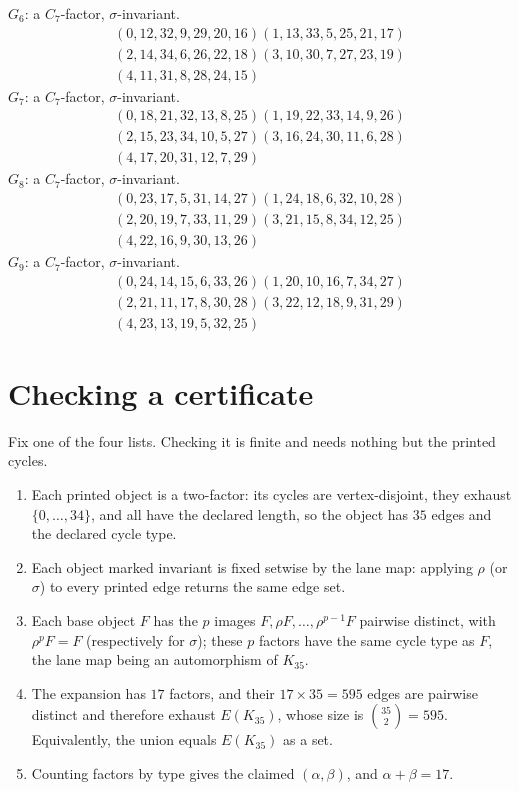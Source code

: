 \documentclass[11pt]{amsart}
\begin{document}
\smallskip\noindent $G_{6}$: a $C_7$-factor, $\sigma$-invariant.
\begin{gather*}
  (0,12,32,9,29,20,16)(1,13,33,5,25,21,17) \\
  (2,14,34,6,26,22,18)(3,10,30,7,27,23,19) \\
  (4,11,31,8,28,24,15)
\end{gather*}
\smallskip\noindent $G_{7}$: a $C_7$-factor, $\sigma$-invariant.
\begin{gather*}
  (0,18,21,32,13,8,25)(1,19,22,33,14,9,26) \\
  (2,15,23,34,10,5,27)(3,16,24,30,11,6,28) \\
  (4,17,20,31,12,7,29)
\end{gather*}
\smallskip\noindent $G_{8}$: a $C_7$-factor, $\sigma$-invariant.
\begin{gather*}
  (0,23,17,5,31,14,27)(1,24,18,6,32,10,28) \\
  (2,20,19,7,33,11,29)(3,21,15,8,34,12,25) \\
  (4,22,16,9,30,13,26)
\end{gather*}
\smallskip\noindent $G_{9}$: a $C_7$-factor, $\sigma$-invariant.
\begin{gather*}
  (0,24,14,15,6,33,26)(1,20,10,16,7,34,27) \\
  (2,21,11,17,8,30,28)(3,22,12,18,9,31,29) \\
  (4,23,13,19,5,32,25)
\end{gather*}

\section{Checking a certificate}\label{sec:check}

Fix one of the four lists. Checking it is finite and needs nothing but
the printed cycles.

\begin{enumerate}
\item Each printed object is a two-factor: its cycles are
  vertex-disjoint, they exhaust $\{0,\dots,34\}$, and all have the
  declared length, so the object has $35$ edges and the declared cycle
  type.
\item Each object marked invariant is fixed setwise by the lane map:
  applying $\rho$ (or $\sigma$) to every printed edge returns the same
  edge set.
\item Each base object $F$ has the $p$ images
  $F,\rho F,\dots,\rho^{p-1}F$ pairwise distinct, with
  $\rho^{p}F=F$ (respectively for $\sigma$); these $p$ factors have
  the same cycle type as $F$, the lane map being an automorphism of
  $K_{35}$.
\item The expansion has $17$ factors, and their $17\times35=595$ edges
  are pairwise distinct and therefore exhaust $E(K_{35})$, whose size is
  $\binom{35}{2}=595$. Equivalently, the union equals $E(K_{35})$ as a
  set.
\item Counting factors by type gives the claimed $(\alpha,\beta)$, and
  $\alpha+\beta=17$.
\end{enumerate}
\end{document}
